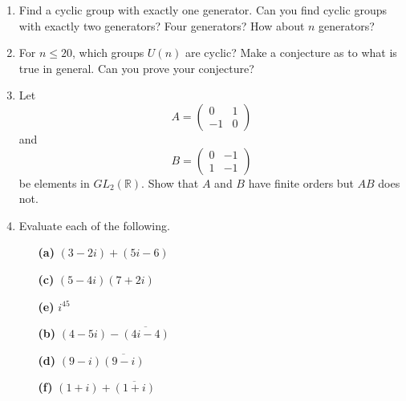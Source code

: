 {\begin{enumerate}
 
\bf\item\rm
Find a cyclic group with exactly one generator.  Can you find cyclic
groups with exactly two generators?  Four generators?  How about $n$
generators?
 
 
\bf\item\rm
For $n \leq 20$, which groups $U(n)$ are cyclic?  Make a conjecture as
to what is true in general.  Can you prove your conjecture?  
 
 
\bf\item\rm
Let
$$
A=
\left(
\begin{array}{cc}
0 & 1 \\
-1 & 0
\end{array}
\right)
$$
and
$$
B=
\left(
\begin{array}{cc}
0 & -1 \\
1 & -1
\end{array}
\right)
$$
be elements in $GL_2( {\mathbb R} )$. Show that $A$ and $B$ have finite
orders but $AB$ does not. 
 
 
\bf\item\rm
Evaluate each of the following.
 
 
\vspace{3pt}        %
 
\hspace{-7pt}
\begin{minipage}[t]{4.6in}
\noindent
\begin{minipage}[t]{2.25in}
\begin{itemize}
 
 \item[{\bf (a)}]
$(3-2i)+ (5i-6)$
 
 \item[{\bf (c)}]
$(5-4i)(7+2i)$
 
 \item[{\bf (e)}]
$i^{45}$
 
\end{itemize}
\end{minipage} \hfill
\begin{minipage}[t]{2.25in}
\begin{itemize}
 
 \item[{\bf (b)}]
 $(4-5i)-\overline{(4i -4)}$
 
 \item[{\bf (d)}]
$(9-i) \overline{(9-i)}$
 
 \item[{\bf (f)}]
$(1+i)+\overline{(1+i)}$
 

\end{itemize}
\end{minipage}
\end{minipage}
\end{enumerate}}
